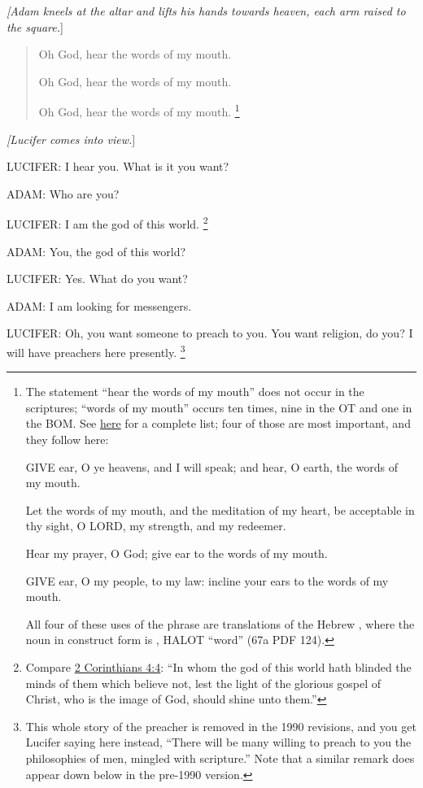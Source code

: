 			\textit{[Adam kneels at the altar and lifts his hands towards heaven, each arm raised to the square.}]

			\begin{quote}
				Oh God, hear the words of my mouth.
				
				Oh God, hear the words of my mouth.
				
				Oh God, hear the words of my mouth.%
					\footnote{%
						\label{ENDOWMENT-words-mouth}%
						The statement ``hear the words of my mouth'' does not occur in the scriptures; ``words of my mouth'' occurs ten times, nine in the OT and one in the BOM. See \hyperref[WORD-PHRASES]{here} for a complete list; four of those are most important, and they follow here:
							\begin{compactdesc}
								\item[Deuteronomy 32:1] GIVE ear, O ye heavens, and I will speak; and hear, O earth, the words of my mouth.
								\item[Psalms 19:14] Let the words of my mouth, and the meditation of my heart, be acceptable in thy sight, O LORD, my strength, and my redeemer.
								\item[Psalms 54:2] Hear my prayer, O God; give ear to the words of my mouth.
								\item[Psalms 78:1] GIVE ear, O my people, to my law: incline your ears to the words of my mouth. 
							\end{compactdesc}
						All four of these uses of the phrase are translations of the Hebrew , where the noun in construct form is , HALOT ``word'' (67a PDF 124).
						}
			\end{quote}
			
			\textit{[Lucifer comes into view.}]

			LUCIFER: I hear you. What is it you want?

			ADAM: Who are you?

			LUCIFER: I am the god of this world.%
				\footnote{%
					Compare \hyperref[2CORINTHIANS-4-4]{2 Corinthians 4:4}: ``In whom the god of this world hath blinded the minds of them which believe not, lest the light of the glorious gospel of Christ, who is the image of God, should shine unto them.'' 
					}

			ADAM: You, the god of this world?

			LUCIFER: Yes. What do you want?

			ADAM: I am looking for messengers.

			LUCIFER: Oh, you want someone to preach to you. You want religion, do you? I will have preachers here presently.%
				\footnote{%
					\label{ENDOWMENT-preachers}%
					This whole story of the preacher is removed in the 1990 revisions, and you get Lucifer saying here instead, ``There will be many willing to preach to you the philosophies of men, mingled with scripture.'' Note that a similar remark does appear down below in the pre-1990 version.
					}
			
